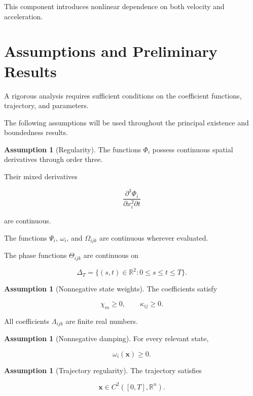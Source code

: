 \documentclass[12pt]{article}
\numberwithin{equation}{section}
\newcommand{\R}{\mathbb{R}}
\theoremstyle{definition}
\newtheorem{assumption}[theorem]{Assumption}
\theoremstyle{remark}
\begin{document}
This component introduces nonlinear
dependence on both velocity and acceleration.


\section{Assumptions and Preliminary Results}

A rigorous analysis requires sufficient
conditions on the coefficient functions,
trajectory, and parameters.

The following assumptions will be used
throughout the principal existence and
boundedness results.

\begin{assumption}[Regularity]

The functions \(\Phi_i\) possess continuous
spatial derivatives through order three.

Their mixed derivatives

\[
\frac{\partial^3\Phi_i}
{\partial x_i^2\partial t}
\]

are continuous.

The functions \(\Psi_i\), \(\omega_i\),
and \(\Omega_{ijk}\) are continuous
wherever evaluated.

The phase functions \(\Theta_{ijk}\)
are continuous on

\[
\Delta_T
=
\{(s,t)\in\R^2:0\leq s\leq t\leq T\}.
\]

\end{assumption}

\begin{assumption}[Nonnegative state weights]

The coefficients satisfy

\[
\chi_m\geq0,
\qquad
\kappa_{ij}\geq0.
\]

All coefficients \(\Lambda_{ijk}\)
are finite real numbers.

\end{assumption}

\begin{assumption}[Nonnegative damping]

For every relevant state,

\[
\omega_i(\mathbf{x})\geq0.
\]

\end{assumption}

\begin{assumption}[Trajectory regularity]

The trajectory satisfies

\[
\mathbf{x}\in C^2([0,T],\R^n).
\]

\end{assumption}
\end{document}
